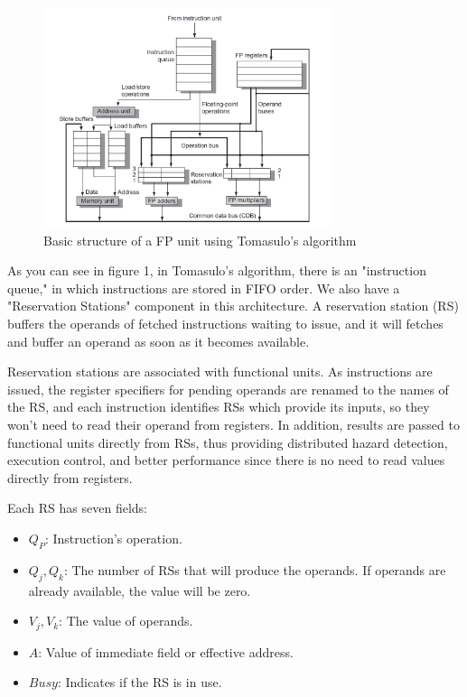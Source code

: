 \documentclass[12pt]{article}
\begin{document}
\begin{figure}[H]
	\centering
	\includegraphics[width=0.75\textwidth]{./images/tomas/tomas.png}	
	\cprotect\caption{Basic structure of a FP unit using Tomasulo’s algorithm}
	\label{fig:tom1}
\end{figure}


As you can see in figure 1, in Tomasulo's algorithm, there is an "instruction queue," in which instructions are stored in FIFO order. We also have a "Reservation Stations" component in this architecture. A reservation station (RS) buffers the operands of fetched instructions waiting to issue, and it will fetches and buffer an operand as soon as it becomes available.

Reservation stations are associated with functional units. As instructions are issued, the register specifiers for pending operands are renamed to the names of the RS, and each instruction identifies RSs which provide its inputs, so they won't need to read their operand from registers.
In addition, results are passed to functional units directly from RSs, thus providing distributed hazard detection, execution control, and better performance since there is no need to read values directly from registers.

Each RS has seven fields:

\begin{itemize}
	\item $Q_P$: Instruction's operation.
	\item $Q_j, Q_k$: The number of RSs that will produce the operands. If operands are already available, the value will be zero.
	\item $V_j, V_k$: The value of operands.
	\item $A$: Value of immediate field or effective address.
	\item $Busy$: Indicates if the RS is in use.
\end{itemize}
\end{document}

